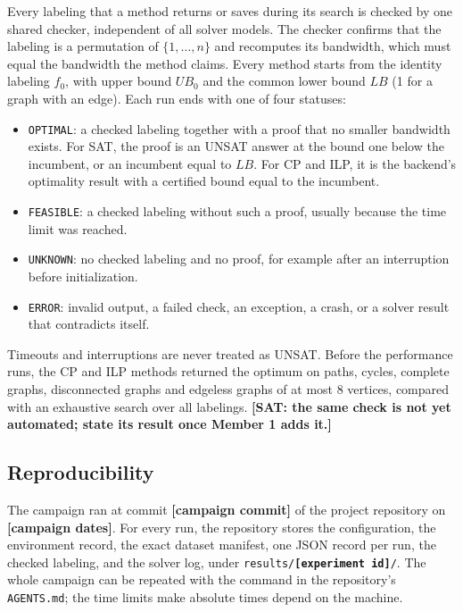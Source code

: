 Every labeling that a method returns or saves during its search is checked by one shared checker, independent of all solver models. The checker confirms that the labeling is a permutation of $\{1, \ldots, n\}$ and recomputes its bandwidth, which must equal the bandwidth the method claims. Every method starts from the identity labeling $f_0$, with upper bound $UB_0$ and the common lower bound $LB$ (1 for a graph with an edge). Each run ends with one of four statuses:
\begin{itemize}
\item \texttt{OPTIMAL}: a checked labeling together with a proof that no smaller bandwidth exists. For SAT, the proof is an UNSAT answer at the bound one below the incumbent, or an incumbent equal to $LB$. For CP and ILP, it is the backend's optimality result with a certified bound equal to the incumbent.
\item \texttt{FEASIBLE}: a checked labeling without such a proof, usually because the time limit was reached.
\item \texttt{UNKNOWN}: no checked labeling and no proof, for example after an interruption before initialization.
\item \texttt{ERROR}: invalid output, a failed check, an exception, a crash, or a solver result that contradicts itself.
\end{itemize}
Timeouts and interruptions are never treated as UNSAT. Before the performance runs, the CP and ILP methods returned the optimum on paths, cycles, complete graphs, disconnected graphs and edgeless graphs of at most 8 vertices, compared with an exhaustive search over all labelings. \textbf{[SAT: the same check is not yet automated; state its result once Member 1 adds it.]}

\subsection{Reproducibility}\label{sec:setup-reproducibility}

The campaign ran at commit \textbf{[campaign commit]} of the project repository on \textbf{[campaign dates]}. For every run, the repository stores the configuration, the environment record, the exact dataset manifest, one JSON record per run, the checked labeling, and the solver log, under \texttt{results/\textbf{[experiment id]}/}. The whole campaign can be repeated with the command in the repository's \texttt{AGENTS.md}; the time limits make absolute times depend on the machine.